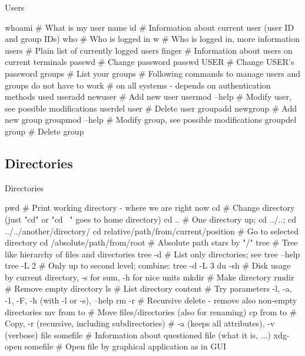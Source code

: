 \documentclass[compress, ucs, xelatex, 11pt, xcolor=svgnames,
  hyperref={
    bookmarks=true,
    unicode=true,
    colorlinks=true,
    pdftitle={Linux, command line and MetaCentrum},
    plainpages=false,
    pdfauthor={Vojtech Zeisek},
    pdfsubject={Course about use of Linux command line, writing shell scripts and using MetaCentrum of CESNET},
    pdfcreator={XeLaTeX, http://www.xelatex.org/},
    pdfkeywords={Linux, GNU, BASH, shell, command line, MetaCentrum},
    linkcolor=Sienna,
    anchorcolor=black,
    citecolor=green,
    filecolor=magenta,
    menucolor=Sienna,
    urlcolor=cyan,
    pdftex},
  url={hyphens, lowtilde} %
  ]{beamer}
\begin{document}
\begin{frame}[fragile]{Users}
  \begin{bashcode}
    whoami # What is my user name
    id # Information about current user (user ID and group IDs)
    who # Who is logged in
    w # Who is logged in, more information
    users # Plain list of currently logged users
    finger # Information about users on current terminals
    passwd # Change password
    passwd USER # Change USER's password
    groups # List your groups
    # Following commands to manage users and groups do not have to work
    # on all systems - depends on authentication methods used
    useradd newuser # Add new user
    usermod --help # Modify user, see possible modifications
    userdel user # Delete user
    groupadd newgroup # Add new group
    groupmod --help # Modify group, see possible modifications
    groupdel group # Delete group
  \end{bashcode}
\end{frame}

\subsection{Directories}

\begin{frame}[fragile]{Directories}
  \begin{bashcode}
    pwd # Print working directory - where we are right now
    cd # Change directory (just "cd" or "cd ~" goes to home directory)
    cd .. # One directory up; cd ../..; cd ../../another/directory/
    cd relative/path/from/current/position # Go to selected directory
    cd /absolute/path/from/root # Absolute path stars by "/"
    tree # Tree like hierarchy of files and directories
    tree -d # List only directories; see tree --help
    tree -L 2 # Only up to second level; combine: tree -d -L 3
    du -sh # Disk usage by current directory, -s for sum, -h for nice units
    mkdir # Make directory
    rmdir # Remove empty directory
    ls # List directory content
       # Try parameters -l, -a, -1, -F, -h (with -l or -s), --help
    rm -r # Recursive delete - remove also non-empty directories
    mv from to # Move files/directories (also for renaming)
    cp from to # Copy, -r (recursive, including subdirectories)        
               # -a (keeps all attributes), -v (verbose)
    file somefile # Information about questioned file (what it is, ...)
    xdg-open somefile # Open file by graphical application as in GUI
  \end{bashcode}
\end{frame}
\end{document}
